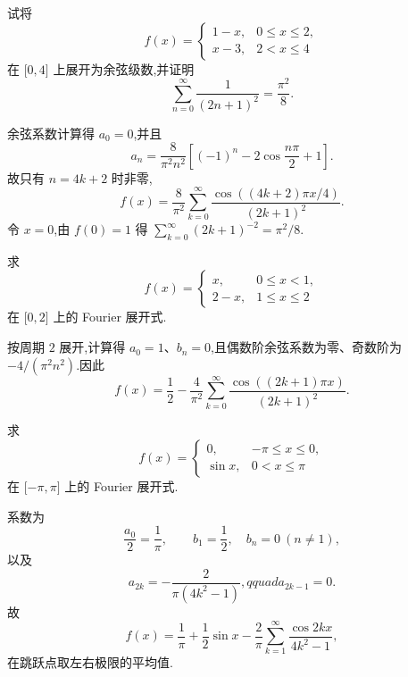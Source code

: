 \begin{example}
    试将
    \[
        f(x)=
        \begin{cases}
            1-x, & 0\leq x\leq2, \\
            x-3, & 2<x\leq4
        \end{cases}
    \]
    在 $\lbrack 0,4\rbrack$ 上展开为余弦级数,并证明
    \[
        \sum\limits_{n=0}^{\infty}\dfrac{1}{(2n+1)^2}=\dfrac{\pi^2}{8}.
    \]
\end{example}
\exampleblank

\begin{solution}
    余弦系数计算得 $a_0=0$,并且
    \[
        a_n=\dfrac{8}{\pi^2n^2}\left[(-1)^n-2\cos\dfrac{n\pi}{2}+1\right].
    \]
    故只有 $n=4k+2$ 时非零,
    \[
        f(x)=\dfrac{8}{\pi^2}\sum\limits_{k=0}^{\infty}
        \dfrac{\cos((4k+2)\pi x/4)}{(2k+1)^2}.
    \]
    令 $x=0$,由 $f(0)=1$ 得
    $\sum_{k=0}^{\infty}(2k+1)^{-2}=\pi^2/8$.
\end{solution}

\begin{example}
    求
    \[
        f(x)=
        \begin{cases}
            x,   & 0\leq x<1,   \\
            2-x, & 1\leq x\leq2
        \end{cases}
    \]
    在 $\lbrack 0,2\rbrack$ 上的 Fourier 展开式.
\end{example}
\exampleblank

\begin{solution}
    按周期 $2$ 展开,计算得 $a_0=1$、$b_n=0$,且偶数阶余弦系数为零、奇数阶为
    $-4/(\pi^2n^2)$.因此
    \[
        f(x)=\dfrac{1}{2}-\dfrac{4}{\pi^2}
        \sum\limits_{k=0}^{\infty}\dfrac{\cos((2k+1)\pi x)}{(2k+1)^2}.
    \]
\end{solution}

\begin{example}
    求
    \[
        f(x)=
        \begin{cases}
            0,      & -\pi\leq x\leq0, \\
            \sin x, & 0<x\leq\pi
        \end{cases}
    \]
    在 $\lbrack -\pi,\pi\rbrack$ 上的 Fourier 展开式.
\end{example}
\exampleblank

\begin{solution}
    系数为
    \[
        \dfrac{a_0}{2}=\dfrac{1}{\pi},\qquad b_1=\dfrac{1}{2},\quad b_n=0\ (n\ne1),
    \]
    以及
    \[
        a_{2k}=-\dfrac{2}{\pi(4k^2-1)},qquad a_{2k-1}=0.
    \]
    故
    \[
        f(x)=\dfrac{1}{\pi}+\dfrac{1}{2}\sin x-
        \dfrac{2}{\pi}\sum\limits_{k=1}^{\infty}\dfrac{\cos2kx}{4k^2-1},
    \]
    在跳跃点取左右极限的平均值.
\end{solution}

